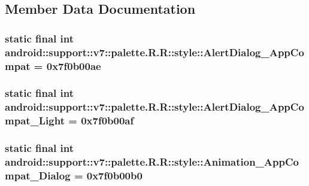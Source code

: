 \subsection{Member Data Documentation}
\hypertarget{classandroid_1_1support_1_1v7_1_1palette_1_1_r_1_1style_d86ba8bf22f708dd1ada21b9264ad1d6}{
\subsubsection[{AlertDialog\_\-AppCompat}]{\setlength{\rightskip}{0pt plus 5cm}static final int android::support::v7::palette.R.R::style::AlertDialog\_\-AppCompat = 0x7f0b00ae}}
\label{classandroid_1_1support_1_1v7_1_1palette_1_1_r_1_1style_d86ba8bf22f708dd1ada21b9264ad1d6}


\hypertarget{classandroid_1_1support_1_1v7_1_1palette_1_1_r_1_1style_6755331690d452067ade9fe674174f46}{
\subsubsection[{AlertDialog\_\-AppCompat\_\-Light}]{\setlength{\rightskip}{0pt plus 5cm}static final int android::support::v7::palette.R.R::style::AlertDialog\_\-AppCompat\_\-Light = 0x7f0b00af}}
\label{classandroid_1_1support_1_1v7_1_1palette_1_1_r_1_1style_6755331690d452067ade9fe674174f46}


\hypertarget{classandroid_1_1support_1_1v7_1_1palette_1_1_r_1_1style_7316e07c60bf6058437ceae3d5f788a2}{
\subsubsection[{Animation\_\-AppCompat\_\-Dialog}]{\setlength{\rightskip}{0pt plus 5cm}static final int android::support::v7::palette.R.R::style::Animation\_\-AppCompat\_\-Dialog = 0x7f0b00b0}}
\label{classandroid_1_1support_1_1v7_1_1palette_1_1_r_1_1style_7316e07c60bf6058437ceae3d5f788a2}


